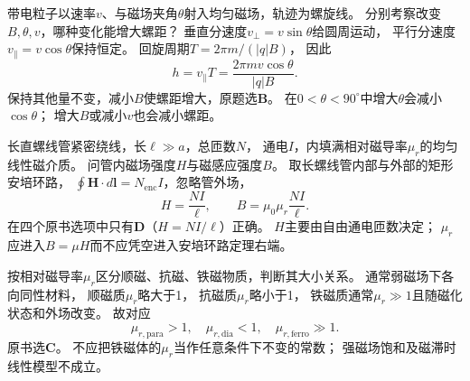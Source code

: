 \problemtext 带电粒子以速率$v$、与磁场夹角$\theta$射入均匀磁场，轨迹为螺旋线。
分别考察改变$B,\theta,v$，哪种变化能增大螺距？
\workings
垂直分速度$v_\perp=v\sin\theta$给圆周运动，
平行分速度$v_\parallel=v\cos\theta$保持恒定。
回旋周期$T=2\pi m/(|q|B)$，
因此
\[
\boxed{h=v_\parallel T
=\frac{2\pi mv\cos\theta}{|q|B}}.
\]
保持其他量不变，减小$B$使螺距增大，原题选\textbf{B}。
\crosscheck 在$0<\theta<90^\circ$中增大$\theta$会减小$\cos\theta$；
增大$B$或减小$v$也会减小螺距。

\problemtext 长直螺线管紧密绕线，长$\ell\gg a$，总匝数$N$，
通电$I$，内填满相对磁导率$\mu_r$的均匀线性磁介质。
问管内磁场强度$H$与磁感应强度$B$。
\workings
取长螺线管内部与外部的矩形安培环路，
$\oint\bm H\cdot d\bm l=N_{\mathrm{enc}}I$，忽略管外场，
\[
\boxed{H=\frac{NI}{\ell}},\qquad
\boxed{B=\mu_0\mu_r\frac{NI}{\ell}}.
\]
在四个原书选项中只有\textbf{D}（$H=NI/\ell$）正确。
\crosscheck $H$主要由自由通电匝数决定；
$\mu_r$应进入$B=\mu H$而不应凭空进入安培环路定理右端。

\problemtext 按相对磁导率$\mu_r$区分顺磁、抗磁、铁磁物质，判断其大小关系。
\workings
通常弱磁场下各向同性材料，
顺磁质$\mu_r$略大于1，
抗磁质$\mu_r$略小于1，
铁磁质通常$\mu_r\gg1$且随磁化状态和外场改变。
故对应
\[
\boxed{\mu_{r,\mathrm{para}}>1,\quad
\mu_{r,\mathrm{dia}}<1,\quad
\mu_{r,\mathrm{ferro}}\gg1}.
\]
原书选\textbf{C}。
\crosscheck 不应把铁磁体的$\mu_r$当作任意条件下不变的常数；
强磁场饱和及磁滞时线性模型不成立。
